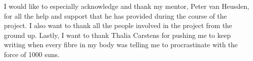 \documentclass[
11pt, %
english, %
onehalfspacing, %
headsepline, %
]{MastersDoctoralThesis} %
\begin{document}
\begin{acknowledgements}
\addchaptertocentry{\acknowledgementname} %
I would like to especially acknowledge and thank my mentor, Peter van Heusden, for all the help and support that he has provided during the course of the project. I also want to thank all the people involved in the project from the ground up. Lastly, I want to thank Thalia Carstens for pushing me to keep writing when every fibre in my body was telling me to procrastinate with the force of 1000 suns.
\end{acknowledgements}


\tableofcontents %

\listoffigures %

\listoftables %

\listofschemes

\lstlistoflistings

\end{document}
